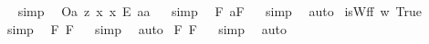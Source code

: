 \begin{isabellebody}
\isadelimproof
\ %
\endisadelimproof
%
\isatagproof
{}\isamarkupfalse%
\ {\isacharparenleft}simp{\isacharparenright}\ \isamarkupfalse%
%
\endisatagproof
{\isafoldproof}%
%
\isadelimproof
%
\endisadelimproof
\isanewline
{}\isamarkupfalse%
\ {\isachardoublequoteopen}{\isacharbrackleft}{\isacharless}O\isactrlsup {\isacharbang}{\isasymbullet}a{\isachargreater}\ {\isasymrightarrow}\isactrlsup z\ {\isacharless}{\isasymlambda}x{\isachardot}\ {\isachardot}x{\isachardot}\ {\isacharequal}\isactrlsub E\ a{\isacharparenright}{\isasymbullet}a{\isachargreater}{\isacharbrackright}{\isachardoublequoteclose}%
\isadelimproof
\ %
\endisadelimproof
%
\isatagproof
{}\isamarkupfalse%
\ {\isacharparenleft}simp{\isacharparenright}\ \isamarkupfalse%
%
\endisatagproof
{\isafoldproof}%
%
\isadelimproof
%
\endisadelimproof
\isanewline
\isanewline
{}\isamarkupfalse%
\ {\isachardoublequoteopen}{\isacharbrackleft}{\isacharparenleft}{\isasymexists}{\isacharparenleft}{\isasymlambda}F{\isachardot}\ {\isacharless}a{\isasymcirc}{\isachardot}F{\isachardot}{\isachargreater}{\isacharparenright}{\isacharparenright}{\isacharbrackright}{\isachardoublequoteclose}%
\isadelimproof
\ %
\endisadelimproof
%
\isatagproof
{}\isamarkupfalse%
\ {\isacharparenleft}simp{\isacharparenright}\ \isamarkupfalse%
\ auto%
\endisatagproof
{\isafoldproof}%
%
\isadelimproof
%
\endisadelimproof
\isanewline
\isanewline
{}\isamarkupfalse%
\ {\isachardoublequoteopen}isWff\ {\isacharcomma}{\isacharparenleft}{\isasymlambda}w{\isachardot}\ True{\isacharparenright}{\isacharcomma}{\isachardoublequoteclose}%
\isadelimproof
\ %
\endisadelimproof
%
\isatagproof
{}\isamarkupfalse%
\ {\isacharparenleft}simp{\isacharparenright}\ \isamarkupfalse%
%
\endisatagproof
{\isafoldproof}%
%
\isadelimproof
%
\endisadelimproof
\isanewline
\isanewline
{}\isamarkupfalse%
\ {\isachardoublequoteopen}{\isacharbrackleft}{\isacharparenleft}{\isasymexists}{\isacharparenleft}{\isasymlambda}F{\isachardot}\ {\isacharcomma}F{\isacharcomma}{\isacharparenright}{\isacharparenright}{\isacharbrackright}{\isachardoublequoteclose}%
\isadelimproof
\ %
\endisadelimproof
%
\isatagproof
{}\isamarkupfalse%
\ {\isacharparenleft}simp{\isacharparenright}\ \isamarkupfalse%
\ auto%
\endisatagproof
{\isafoldproof}%
%
\isadelimproof
%
\endisadelimproof
\isanewline
{}\isamarkupfalse%
\ {\isachardoublequoteopen}{\isacharbrackleft}{\isacharparenleft}{\isasymexists}{\isacharparenleft}{\isasymlambda}F{\isachardot}\ {\isacharsemicolon}F{\isacharsemicolon}{\isacharparenright}{\isacharparenright}{\isacharbrackright}{\isachardoublequoteclose}%
\isadelimproof
\ %
\endisadelimproof
%
\isatagproof
{}\isamarkupfalse%
\ {\isacharparenleft}simp{\isacharparenright}\ \isamarkupfalse%
\ auto\isanewline
%
\endisatagproof
{\isafoldproof}%
%
\isadelimproof
%
\endisadelimproof
%
\isadelimtheory
%
\endisadelimtheory
%
\isatagtheory
%
\endisatagtheory
{\isafoldtheory}%
%
\isadelimtheory
%
\endisadelimtheory
\end{isabellebody}%
